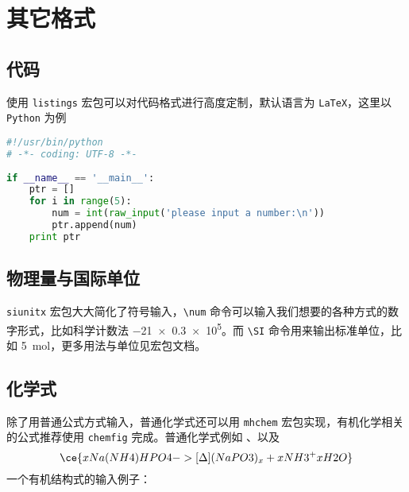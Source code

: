 
\chapter{其它格式}

\section{代码}
使用 \lstinline{listings} 宏包可以对代码格式进行高度定制，默认语言为 \lstinline{LaTeX}，这里以 \lstinline{Python} 为例
\begin{lstlisting}[language=Python,caption={python程序练习题}]
#!/usr/bin/python
# -*- coding: UTF-8 -*-
    
if __name__ == '__main__':
    ptr = []
    for i in range(5):
        num = int(raw_input('please input a number:\n'))
        ptr.append(num)
    print ptr    
\end{lstlisting}

\section{物理量与国际单位}
\lstinline{siunitx} 宏包大大简化了符号输入，\lstinline{\num} 命令可以输入我们想要的各种方式的数字形式，比如科学计数法 \num{-21x.3e5}。而 \lstinline{\SI} 命令用来输出标准单位，比如 \SI{5}{\mole}，更多用法与单位见宏包文档。

\section{化学式}
除了用普通公式方式输入，普通化学式还可以用 \lstinline{mhchem} 宏包实现，有机化学相关的公式推荐使用 \lstinline{chemfig} 完成。普通化学式例如 、以及
    \[\ce{x Na(NH4)HPO4 ->[\Delta] (NaPO3)_x + x NH3 ^ + x H2O}\]
一个有机结构式的输入例子：
    